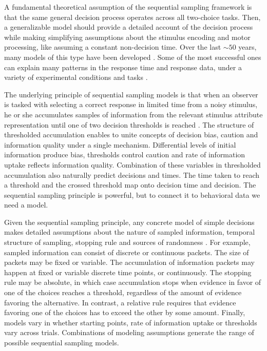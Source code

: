 \documentclass[12pt]{report}
\begin{document}
A fundamental theoretical assumption of the sequential sampling framework
is that the same general decision process operates across all two-choice
tasks. Then, a generalizable model should provide a detailed account of the
decision process while making simplifying assumptions about the stimulus encoding
and motor processing, like assuming a constant non-decision time. Over the last $\sim50$ years, many models of this type
have been developed \citep{Sto1960,Rat1978,Vic1979,RatTue2002,Smi1995,UshMcc2001,BroHea2008}. Some of the most successful ones
can explain many patterns in the response time and response data,
under a variety of experimental conditions and tasks
\citep{RatSmi2004,Wag2009}.
    
The underlying principle of sequential sampling models is that when an
observer is tasked with selecting a correct response in limited time
from a noisy stimulus, he or she accumulates samples of 
information from the relevant stimulus attribute representation until one of two
decision thresholds is reached
\citep{Vic1979,TowAsh1983,Luc1986,BogBro2006}. The structure of thresholded accumulation enables to unite concepts of decision bias, caution and information quality under a single mechanism. Differential levels of initial information produce bias, thresholds control caution and rate of information uptake reflects information quality. Combination of these variables in thresholded accumulation also naturally predict decisions and times. The time taken to reach a threshold and the crossed threshold map onto decision time and decision. The sequential sampling principle is powerful, but to connect it to behavioral data we need a model. 
    
Given the sequential sampling principle, any concrete model of simple decisions makes detailed assumptions about the nature of sampled
information, temporal structure of sampling, stopping rule and sources of
randomness \citep{Vic1979,RatSmi2004,BogBro2006,TeoUsh2013}. For example, sampled information can consist of discrete or
continuous packets. The size of packets may be fixed or variable. The
accumulation of information packets may happen at fixed or variable
discrete time points, or continuously. The stopping rule may be absolute,
in which case accumulation stops when evidence in favor of one of the
choices reaches a threshold, regardless of the amount of evidence favoring
the alternative. In contrast, a relative rule requires that evidence
favoring one of the choices has to exceed the other by some amount. Finally, models vary in whether starting points, rate of information uptake or thresholds vary across trials. Combinations of
modeling assumptions generate the range of possible sequential sampling
models.
    
\end{document}
